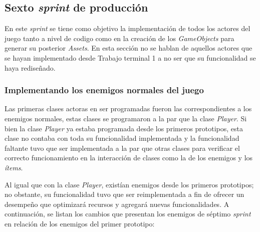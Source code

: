 \subsection{Sexto \textit{sprint} de producción}
En este \textit{sprint} se tiene como objetivo la implementación de todos los 
actores del juego tanto a nivel de codigo como en la creación de los 
\textit{GameObjects} para generar su posterior \textit{Assets}. En esta sección 
no se hablan de aquellos actores que se hayan implementado desde Trabajo terminal 
1 a no ser que su funcionalidad se haya rediseñado.

\subsubsection{Implementando los enemigos normales del juego} 
Las primeras clases actoras en ser programadas fueron las correspondientes a los 
enemigos normales, estas clases se programaron a la par que la clase \textit{Player}. 
Si bien la clase \textit{Player} ya estaba programada desde los primeros prototipos, 
esta clase no contaba con toda su funcionalidad implementada y la funcionalidad 
faltante tuvo que ser implementada a la par que otras clases para verificar el 
correcto funcionamiento en la interacción de clases como la de los enemigos y los 
\textit{ítems}.
\\
\par 
Al igual que con la clase \textit{Player},  existían enemigos desde los primeros prototipos; no obstante, 
su funcionalidad tuvo que ser reimplementada a fin de ofrecer un desempeño que 
optimizará recursos y agregará nuevas funcionalidades. A continuación, se listan los 
cambios que presentan los enemigos de séptimo \textit{sprint} en relación de los 
enemigos del primer prototipo: 

